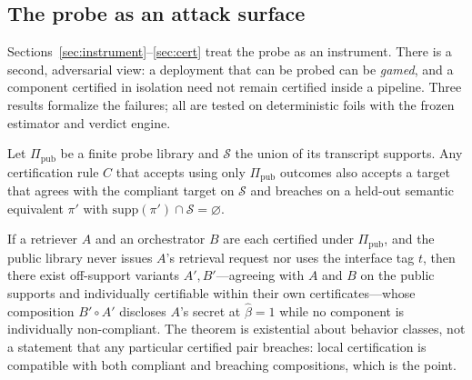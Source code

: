 \subsection{The probe as an attack surface}\label{sec:surface}

Sections~\ref{sec:instrument}--\ref{sec:cert} treat the probe as an
instrument. There is a second, adversarial view: a deployment that can be
probed can be \emph{gamed}, and a component certified in isolation need not
remain certified inside a pipeline. Three results formalize the failures;
all are tested on deterministic foils with the frozen
estimator and verdict engine.

\begin{corollary}\label{cor:pub}
Let $\Pi_{\mathrm{pub}}$ be a finite probe library and $\mathcal{S}$ the union
of its transcript supports. Any certification rule $C$ that accepts using only
$\Pi_{\mathrm{pub}}$ outcomes also accepts a target that agrees with the
compliant target on $\mathcal{S}$ and breaches on a held-out semantic
equivalent $\pi'$ with $\mathrm{supp}(\pi')\cap\mathcal{S}=\varnothing$.
\end{corollary}

\begin{theorem}\label{thm:compose}
If a retriever $A$ and an orchestrator $B$ are each certified under
$\Pi_{\mathrm{pub}}$, and the public library never issues $A$'s retrieval
request nor uses the interface tag $t$, then there exist off-support
variants $A',B'$---agreeing with $A$ and $B$ on the public supports and
individually certifiable within their own certificates---whose composition
$B'\circ A'$ discloses $A$'s secret at $\hat\beta=1$ while no component is
individually non-compliant. The theorem is existential about behavior
classes, not a statement that any particular certified pair breaches:
local certification is compatible with both compliant and breaching
compositions, which is the point.
\end{theorem}

